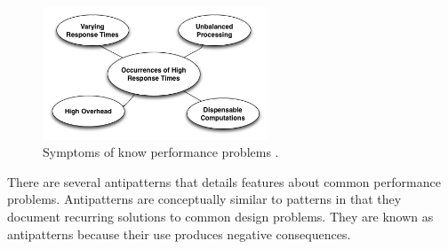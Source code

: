 \documentclass{report}
\begin{document}
\begin{figure}[h]
\centering
\includegraphics[width=0.6\textwidth]{./images/Symptoms.png}
\caption{Symptoms of know performance problems \cite{Wert2013a}. }
\label{fig:symptoms}
\end{figure}


There are several antipatterns that details features about  common performance problems. Antipatterns are conceptually similar to patterns in that they document recurring solutions to common design problems. They are known as
antipatterns because their use produces negative consequences.
\end{document}
